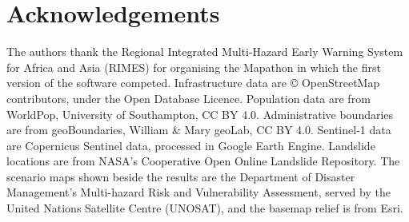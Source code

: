 \documentclass[preprint,12pt]{elsarticle}
\begin{document}
\section*{Acknowledgements}
The authors thank the Regional Integrated Multi-Hazard Early Warning System for Africa and Asia (RIMES) for organising the Mapathon in which the first version of the software competed. Infrastructure data are \copyright{} OpenStreetMap contributors, under the Open Database Licence. Population data are from WorldPop, University of Southampton, CC BY 4.0. Administrative boundaries are from geoBoundaries, William \& Mary geoLab, CC BY 4.0. Sentinel-1 data are Copernicus Sentinel data, processed in Google Earth Engine. Landslide locations are from NASA's Cooperative Open Online Landslide Repository. The scenario maps shown beside the results are the Department of Disaster Management's Multi-hazard Risk and Vulnerability Assessment, served by the United Nations Satellite Centre (UNOSAT), and the basemap relief is from Esri.



\end{document}
